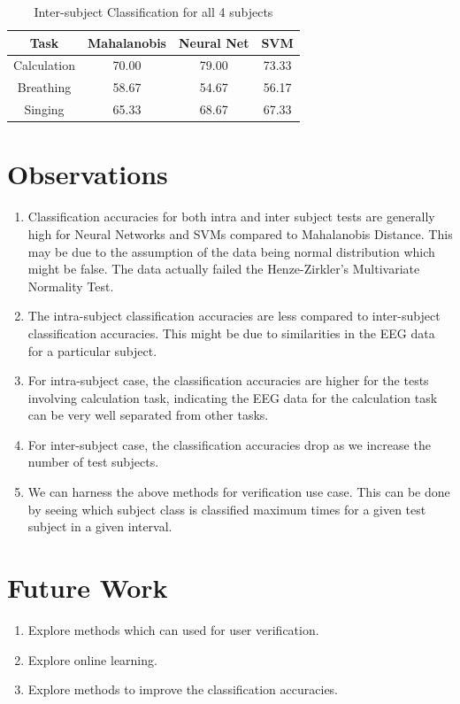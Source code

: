 \documentclass[11pt]{article}
\begin{document}
		\begin{table}[h!]
			\centering
			\caption{Inter-subject Classification for all 4 subjects}
			\label{In1234}
			\begin{tabular}{c c c c}
				\hline
				Task &Mahalanobis &Neural Net &SVM\\\hline
				Calculation &70.00 &79.00 &73.33\\
				Breathing &58.67 &54.67 &56.17\\
				Singing &65.33 &68.67 &67.33\\
			\end{tabular}
		\end{table}
		\FloatBarrier

\section{Observations}
	\begin{enumerate}
		\item Classification accuracies for both intra and inter subject tests are generally high for Neural Networks and SVMs compared to Mahalanobis Distance. This may be due to the assumption of the data being normal distribution which might be false. The data actually failed the Henze-Zirkler's Multivariate Normality Test.

		\item The intra-subject classification accuracies are less compared to inter-subject classification accuracies. This might be due to similarities in the EEG data for a particular subject.

		\item For intra-subject case, the classification accuracies are higher for the tests involving calculation task, indicating the EEG data for the calculation task can be very well separated from other tasks.

		\item For inter-subject case, the classification accuracies drop as we increase the number of test subjects.

		\item We can harness the above methods for verification use case. This can be done by seeing which subject class is classified maximum times for a given test subject in a given interval.
	\end{enumerate}


\section{Future Work}
	\begin{enumerate}
		\item Explore methods which can used for user verification.
		\item Explore online learning.
		\item Explore methods to improve the classification accuracies.
	\end{enumerate}
\end{document}
